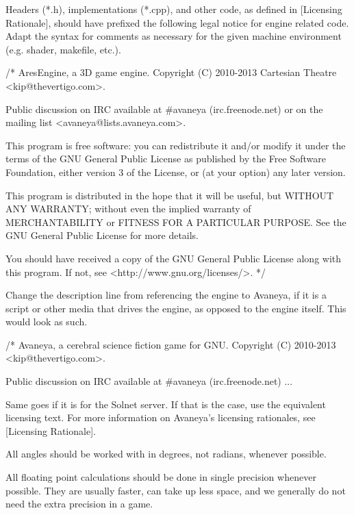 Headers (*.h), implementations (*.cpp), and other code, as defined in [Licensing Rationale], should have prefixed the following legal notice for engine related code. Adapt the syntax for comments as necessary for the given machine environment (e.g. shader, makefile, etc.).

\startCodeExample
/*
    AresEngine, a 3D game engine.
    Copyright (C) 2010-2013 Cartesian Theatre <kip@thevertigo.com>.

    Public discussion on IRC available at #avaneya (irc.freenode.net)
    or on the mailing list <avaneya@lists.avaneya.com>.

    This program is free software: you can redistribute it and/or modify
    it under the terms of the GNU General Public License as published by
    the Free Software Foundation, either version 3 of the License, or
    (at your option) any later version.

    This program is distributed in the hope that it will be useful,
    but WITHOUT ANY WARRANTY; without even the implied warranty of
    MERCHANTABILITY or FITNESS FOR A PARTICULAR PURPOSE.  See the
    GNU General Public License for more details.

    You should have received a copy of the GNU General Public License
    along with this program.  If not, see <http://www.gnu.org/licenses/>.
*/
\stopCodeExample

Change the description line from referencing the engine to Avaneya, if it is a script or other media that drives the engine, as opposed to the engine itself. This would look as such.

\startCodeExample
/*
    Avaneya, a cerebral science fiction game for GNU.
    Copyright (C) 2010-2013 <kip@thevertigo.com>.

    Public discussion on IRC available at #avaneya (irc.freenode.net)
    ...
\stopCodeExample

Same goes if it is for the Solnet server. If that is the case, use the equivalent licensing text. For more information on Avaneya's licensing rationales, see [Licensing Rationale].


\startitemize[4]
\item
All angles should be worked with in degrees, not radians, whenever possible.

\item
All floating point calculations should be done in single precision whenever possible. They are usually faster, can take up less space, and we generally do not need the extra precision in a game.
\stopitemize

